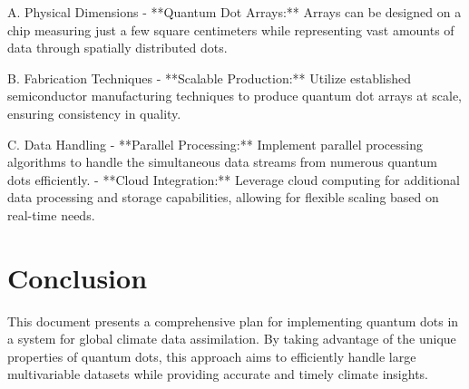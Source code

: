 \documentclass{article}
\begin{document}
 A. Physical Dimensions
- **Quantum Dot Arrays:** Arrays can be designed on a chip measuring just a few square centimeters while representing vast amounts of data through spatially distributed dots.

 B. Fabrication Techniques
- **Scalable Production:** Utilize established semiconductor manufacturing techniques to produce quantum dot arrays at scale, ensuring consistency in quality.

 C. Data Handling
- **Parallel Processing:** Implement parallel processing algorithms to handle the simultaneous data streams from numerous quantum dots efficiently.
- **Cloud Integration:** Leverage cloud computing for additional data processing and storage capabilities, allowing for flexible scaling based on real-time needs.

\section{Conclusion}
This document presents a comprehensive plan for implementing quantum dots in a system for global climate data assimilation. By taking advantage of the unique properties of quantum dots, this approach aims to efficiently handle large multivariable datasets while providing accurate and timely climate insights.
\end{document}
